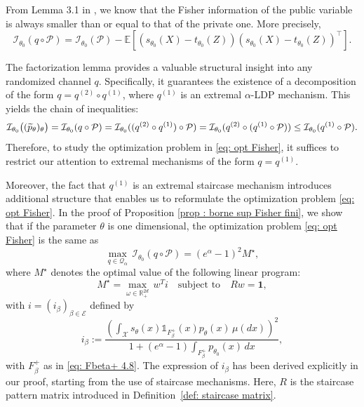 \documentclass[a4paper, 11pt]{article}
\theoremstyle{definition}
\newcommand{\indi}[1]{\mathds{1}_{#1}}
\begin{document}
{From Lemma 3.1 in \cite{steinbergerEfficiencyLocalDifferent}, we know that the Fisher information of the public variable is always smaller than or equal to that of the private one. More precisely,
\begin{equation} \label{eq : decroissance Fisher}
\mathcal{I}_{\theta_0}(q \circ \mathcal{P}) = \mathcal{I}_{\theta_0}(\mathcal{P}) -
\mathbb{E}\left[\left(s_{\theta_0}(X) - t_{\theta_0}(Z)\right)\left(s_{\theta_0}(X) - t_{\theta_0}(Z)\right)^{\top} \right].
\end{equation}

The factorization lemma provides a valuable structural insight into any randomized channel $q$. Specifically, it guarantees the existence of a decomposition of the form $q = q^{(2)} \circ q^{(1)}$, where $q^{(1)}$ is an extremal $\alpha$-LDP mechanism. This yields the chain of inequalities:
\begin{equation}{\label{eq: fact on Fisher}}
\mathcal{I}_{\theta_0}\big((\widetilde{p}_\theta)_\theta\big)
= \mathcal{I}_{\theta_0}(q \circ \mathcal{P}) 
= \mathcal{I}_{\theta_0}((q^{(2)} \circ q^{(1)}) \circ \mathcal{P}) 
= \mathcal{I}_{\theta_0}(q^{(2)} \circ (q^{(1)} \circ \mathcal{P})) 
\le \mathcal{I}_{\theta_0}(q^{(1)} \circ \mathcal{P}). 
\end{equation}
Therefore, to study the optimization problem in \eqref{eq: opt Fisher}, it suffices to restrict our attention to extremal mechanisms of the form $q = q^{(1)}$.

Moreover, the fact that \( q^{(1)} \) is an extremal staircase mechanism introduces additional structure that enables us to reformulate the optimization problem \eqref{eq: opt Fisher}. In the proof of Proposition \ref{prop : borne sup Fisher fini}, we show that if the parameter $\theta$ is one dimensional, the optimization problem \eqref{eq: opt Fisher} is the same as
\[
\max_{q \in \mathcal{Q}_\alpha} \, \mathcal{I}_{\theta_0}(q \circ \mathcal{P}) = (e^\alpha - 1)^2 M^\star,
\]
where \( M^\star \) denotes the optimal value of the following linear program:
\begin{equation} \label{eq: opt 14.75}
M^\star = \max_{\omega \in \mathbb{R}_+^{2d}} \, w^T i \quad \text{subject to} \quad Rw = \bm{1},
\end{equation}
with \( i = (i_\beta)_{\beta \in \mathcal{E}} \) defined by
\begin{equation} \label{eq : def i beta}
i_\beta := \frac{\left( \int_\mathcal{X} s_\theta(x) \indi{F^+_\beta}(x) p_\theta(x) \, \mu(dx) \right)^2}{1 + (e^\alpha - 1) \int_{F^+_\beta} p_{\theta_0}(x) \, dx},
\end{equation}
with $F_\beta^+$ as in \eqref{eq: Fbeta+ 4.8}. The expression of $i_\beta$ has been derived explicitly in our proof, starting from the use of staircase mechanisms. Here, \( R \) is the staircase pattern matrix introduced in Definition~\ref{def: staircase matrix}.


}
\end{document}
